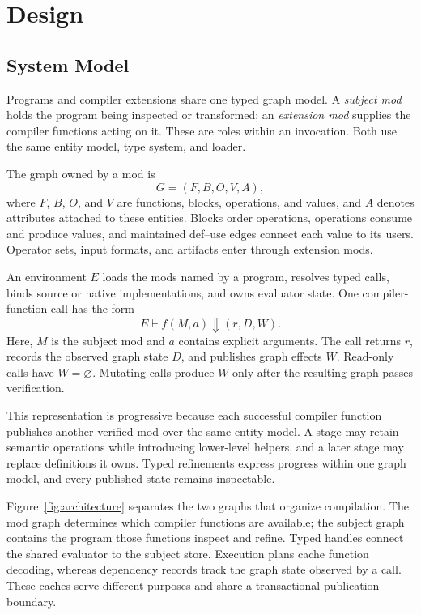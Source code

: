 \section{Design}
\label{sec:design}

\subsection{System Model}
\label{sec:system-model}

Programs and compiler extensions share one typed graph model.
A \emph{subject mod} holds the program being inspected or transformed; an
\emph{extension mod} supplies the compiler functions acting on it. These are roles
within an invocation. Both use the same entity model, type system, and loader.

The graph owned by a mod is
\[
  G = (F, B, O, V, A),
\]
where $F$, $B$, $O$, and $V$ are functions, blocks, operations, and values, and
$A$ denotes attributes attached to these entities. Blocks order operations,
operations consume and produce values, and maintained def--use edges connect
each value to its users. Operator sets, input formats, and artifacts enter
through extension mods.

An environment $E$ loads the mods named by a program, resolves typed calls,
binds source or native implementations, and owns evaluator state. One
compiler-function call has the form
\[
  E \vdash f(M, a) \Downarrow (r, D, W).
\]
Here, $M$ is the subject mod and $a$ contains explicit arguments. The call
returns $r$, records the observed graph state $D$, and publishes graph effects
$W$. Read-only calls have $W=\varnothing$. Mutating calls produce $W$ only
after the resulting graph passes verification.

This representation is progressive because each successful compiler
function publishes another verified mod over the same entity model. A stage may
retain semantic operations while introducing lower-level helpers, and a later
stage may replace definitions it owns. Typed refinements express progress
within one graph model, and every published state remains inspectable.

Figure~\ref{fig:architecture} separates the two graphs that organize
compilation. The mod graph determines which compiler functions are available;
the subject graph contains the program those functions inspect and refine.
Typed handles connect the shared evaluator to the subject store. Execution
plans cache function decoding, whereas dependency records track the graph
state observed by a call. These caches serve different purposes and share a
transactional publication boundary.

